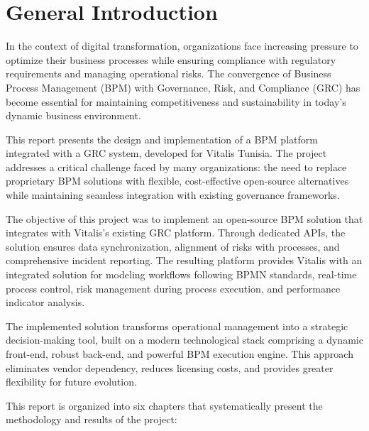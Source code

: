 \chapter*{General Introduction}

In the context of digital transformation, organizations face increasing pressure to optimize their business processes while ensuring compliance with regulatory requirements and managing operational risks. The convergence of Business Process Management (BPM) with Governance, Risk, and Compliance (GRC) has become essential for maintaining competitiveness and sustainability in today's dynamic business environment.

This report presents the design and implementation of a BPM platform integrated with a GRC system, developed for Vitalis Tunisia. The project addresses a critical challenge faced by many organizations: the need to replace proprietary BPM solutions with flexible, cost-effective open-source alternatives while maintaining seamless integration with existing governance frameworks.

The objective of this project was to implement an open-source BPM solution that integrates with Vitalis's existing GRC platform. Through dedicated APIs, the solution ensures data synchronization, alignment of risks with processes, and comprehensive incident reporting. The resulting platform provides Vitalis with an integrated solution for modeling workflows following BPMN standards, real-time process control, risk management during process execution, and performance indicator analysis.

The implemented solution transforms operational management into a strategic decision-making tool, built on a modern technological stack comprising a dynamic front-end, robust back-end, and powerful BPM execution engine. This approach eliminates vendor dependency, reduces licensing costs, and provides greater flexibility for future evolution.

This report is organized into six chapters that systematically present the methodology and results of the project:

